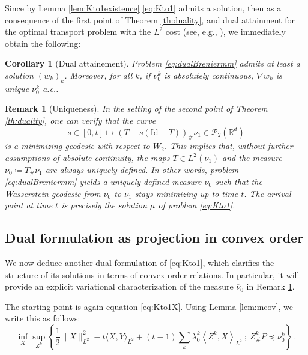 \documentclass[12pt]{amsart}
\numberwithin{equation}{section}
\let\mc=\mathcal
\let\mr=\mathrm
\theoremstyle{plain}
\newtheorem{remark}[theorem]{Remark}
\newtheorem{corollary}[theorem]{Corollary}
\theoremstyle{definition}
\begin{document}
Since by Lemma \ref{lem:Kto1existence} \eqref{eq:Kto1} admits a solution, then as a consequence of the first point of Theorem \ref{th:duality}, and dual attainment for the optimal transport problem with the $L^2$ cost (see, e.g., \cite[Theorem 5.10]{villani2009optimal}), we immediately obtain the following:

\begin{corollary}[Dual attainement] Problem \eqref{eq:dualBreniermm} admits at least a solution $(w_k)_k$. Moreover, for all $k$, if $\nu_0^k$ is absolutely continuous, $\nabla w_k$ is unique $\nu_0^k$-a.e..
\end{corollary}


\begin{remark}[Uniqueness] \label{rem:uniqueness} In the setting of the second point of Theorem \ref{th:duality}, one can verify that the curve
\[
s\in[0,t] \mapsto (T +s(\mr{Id}-T))_\# \nu_1 \in\mc{P}_2(\mathbb{R}^d)
\]
is a minimizing geodesic with respect to $W_2$. This implies that, without further assumptions of absolute continuity, the maps $T \in L^2(\nu_1)$ and the measure $\overline{\nu}_0 \coloneqq T_\#\nu_1$ are always uniquely defined. In other words, problem \eqref{eq:dualBreniermm} yields a uniquely defined measure $\overline{\nu}_0$ such that the Wasserstein geodesic from $\overline{\nu}_0$ to $\nu_1$ stays minimizing up to time $t$. The arrival point at time $t$ is precisely the solution $\mu$ of problem \eqref{eq:Kto1}.
\end{remark}

\subsection{Dual formulation as projection in convex order}
We now deduce another dual formulation of \eqref{eq:Kto1}, which clarifies the structure of its solutions in terms of convex order relations. In particular, it will provide  an explicit variational characterization of the measure $\overline{\nu}_0$ in Remark \ref{rem:uniqueness}.

The starting point is again equation \eqref{eq:Kto1X}. Using Lemma \ref{lem:mcov}, we write this as follows:
\begin{equation}\label{eq:saddle}
\inf_{X} \sup_{Z^k} \left\{ \frac{1}{2} \|X\|^2_{L^2} -t \langle X,Y\rangle_{L^2}  + (t-1)\sum_{k} \lambda_0^k \left\langle Z^k,X \right \rangle_{L^2} ~;~ Z^k_\# P \preceq \nu_0^k \right\}\,.
\end{equation}
\end{document}

